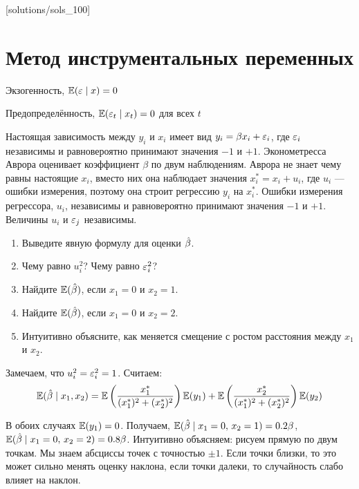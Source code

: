 [solutions/sols_100]

\chapter{Метод инструментальных переменных}



Экзогенность, $\mathbb{E}(\varepsilon\mid x)=0$

Предопределённость, $\mathbb{E}(\varepsilon_t\mid x_t)=0$ для всех $t$



\begin{problem}
Настоящая зависимость между $y_i$ и $x_i$ имеет вид $y_i=\beta x_i +\varepsilon_i$, где $\varepsilon_i$ независимы и равновероятно принимают значения $-1$ и $+1$. Эконометресса Аврора оценивает коэффициент $\beta$ по двум наблюдениям. Аврора не знает чему равны настоящие $x_i$, вместо них она наблюдает значения $x^*_i=x_i+u_i$, где $u_i$ — ошибки измерения, поэтому она строит регрессию $y_i$ на $x_i^*$. Ошибки измерения регрессора, $u_i$, независимы и равновероятно принимают значения $-1$ и $+1$. Величины $u_i$ и $\varepsilon_j$ независимы.
\begin{enumerate}
\item Выведите явную формулу для оценки $\hat{\beta}$.
\item Чему равно $u_i^2$? Чему равно $\varepsilon_i^2$?
\item Найдите $\mathbb{E}(\hat{\beta})$, если $x_1=0$ и $x_2=1$.
\item Найдите $\mathbb{E}(\hat{\beta})$, если $x_1=0$ и $x_2=2$.
\item Интуитивно объясните, как меняется смещение с ростом расстояния между $x_1$ и $x_2$.
\end{enumerate}


\begin{sol}
Замечаем, что $u_i^2=\varepsilon_i^2=1$. Считаем:
\[
\mathbb{E}(\hat{\beta} \mid x_1, x_2) = \mathbb{E}\left( \frac{x_1^*}{(x_1^*)^2  + (x_2^*)^2}\right) \mathbb{E}(y_1) + \mathbb{E}\left( \frac{x_2^*}{(x_1^*)^2  + (x_2^*)^2}\right) \mathbb{E}(y_2)
\]

В обоих случаях $\mathbb{E}(y_1)=0$. Получаем, $\mathbb{E}(\hat{\beta} \mid x_1=0, \, x_2=1)=0.2\beta$, $\mathbb{E}(\hat{\beta} \mid x_1=0, \, x_2=2)=0.8\beta$. Интуитивно объясняем: рисуем прямую по двум точкам. Мы знаем абсциссы точек с точностью $\pm 1$. Если точки близки, то это может сильно менять оценку наклона, если точки далеки, то случайность слабо влияет на наклон.
\end{sol}
\end{problem}


